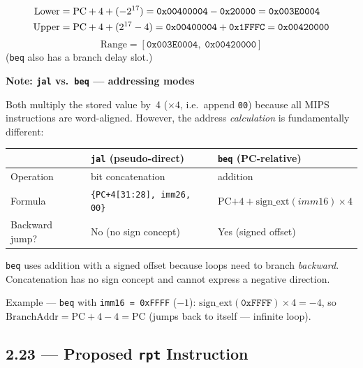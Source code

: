 \begin{align}
  \text{Lower} &= \text{PC}+4 + (-2^{17})
    = \texttt{0x00400004} - \texttt{0x20000}
    = \texttt{0x003E0004} \notag\\
  \text{Upper} &= \text{PC}+4 + (2^{17}-4)
    = \texttt{0x00400004} + \texttt{0x1FFFC}
    = \texttt{0x00420000} \notag
\end{align}
\[
  \text{Range} = [\texttt{0x003E0004},\; \texttt{0x00420000}]
\]
(\texttt{beq} also has a branch delay slot.)

\begin{flushright}
\begin{minipage}{0.92\linewidth}
\scriptsize
\textbf{Note: \texttt{jal} vs.\ \texttt{beq} --- addressing modes}\par\smallskip
Both multiply the stored value by~4 ($\times 4$, i.e.\ append
\texttt{00}) because all MIPS instructions are word-aligned.
However, the address \emph{calculation} is fundamentally different:

\smallskip
\begin{tabular}{@{}l l l@{}}
\toprule
& \texttt{jal} (pseudo-direct) & \texttt{beq} (PC-relative) \\
\midrule
Operation & bit concatenation & addition \\
Formula &
  \texttt{\{PC+4[31:28], imm26, 00\}} &
  $\text{PC+4} + \text{sign\_ext}(\textit{imm16}) \times 4$ \\
Backward jump? & No (no sign concept) & Yes (signed offset) \\
\bottomrule
\end{tabular}

\smallskip
\texttt{beq} uses addition with a signed offset because loops need
to branch \emph{backward}. Concatenation has no sign concept and
cannot express a negative direction.

\smallskip
Example --- \texttt{beq} with \texttt{imm16 = 0xFFFF} ($-1$):
$\text{sign\_ext}(\texttt{0xFFFF}) \times 4 = -4$,
so $\text{BranchAddr} = \text{PC}+4-4 = \text{PC}$
(jumps back to itself --- infinite loop).
\end{minipage}
\end{flushright}

\subsection*{2.23 --- Proposed \texttt{rpt} Instruction}
\hypertarget{sol-2.23}{}

